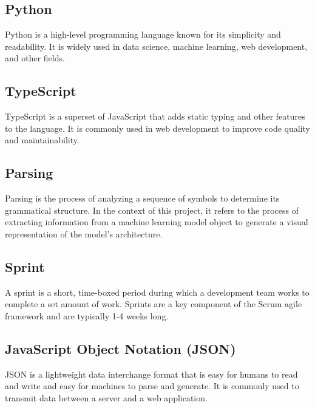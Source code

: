 \subsection*{Python}
Python is a high-level programming language known for its simplicity and readability. It is widely used in data science, machine learning, web development, and other fields.

\subsection*{TypeScript}
TypeScript is a superset of JavaScript that adds static typing and other features to the language. It is commonly used in web development to improve code quality and maintainability.

\subsection*{Parsing}
Parsing is the process of analyzing a sequence of symbols to determine its grammatical structure. In the context of this project, it refers to the process of extracting information from a machine learning model object to generate a visual representation of the model's architecture.

\subsection*{Sprint}
A sprint is a short, time-boxed period during which a development team works to complete a set amount of work. Sprints are a key component of the Scrum agile framework and are typically 1-4 weeks long.

\subsection*{JavaScript Object Notation (JSON)}
JSON is a lightweight data interchange format that is easy for humans to read and write and easy for machines to parse and generate. It is commonly used to transmit data between a server and a web application.